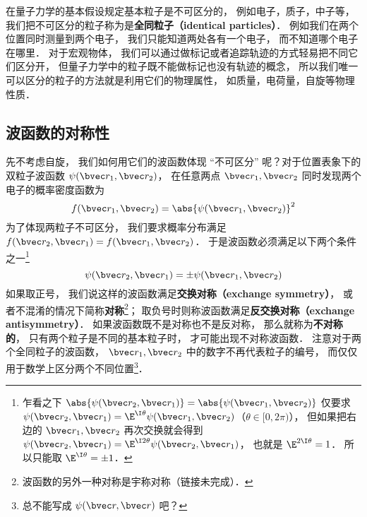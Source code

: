 

在量子力学的基本假设规定基本粒子是不可区分的， 例如电子，质子，中子等， 我们把不可区分的粒子称为是\textbf{全同粒子（identical particles）}． 例如我们在两个位置同时测量到两个电子， 我们只能知道两处各有一个电子， 而不知道哪个电子在哪里． 对于宏观物体， 我们可以通过做标记或者追踪轨迹的方式轻易把不同它们区分开， 但量子力学中的粒子既不能做标记也没有轨迹的概念， 所以我们唯一可以区分的粒子的方法就是利用它们的物理属性， 如质量，电荷量，自旋等物理性质．

\subsection{波函数的对称性}
先不考虑自旋， 我们如何用它们的波函数体现 “不可区分” 呢？对于位置表象下的双粒子波函数 $\psi(\bvec r_1, \bvec r_2)$， 在任意两点 $\bvec r_1, \bvec r_2$ 同时发现两个电子的概率密度函数为%
\begin{equation}
f(\bvec r_1, \bvec r_2) = \abs{\psi(\bvec r_1, \bvec r_2)}^2
\end{equation}
为了体现两粒子不可区分， 我们要求概率分布满足 $f(\bvec r_2, \bvec r_1) = f(\bvec r_1, \bvec r_2)$． 于是波函数必须满足以下两个条件之一\footnote{乍看之下 $\abs{\psi(\bvec r_2, \bvec r_1)} = \abs{\psi(\bvec r_1, \bvec r_2)}$ 仅要求 $\psi(\bvec r_2, \bvec r_1) = \E^{\I \theta} \psi(\bvec r_1, \bvec r_2)$（$\theta \in [0, 2\pi)$）， 但如果把右边的 $\bvec r_1, \bvec r_2$ 再次交换就会得到 $\psi(\bvec r_2, \bvec r_1) = \E^{\I 2\theta} \psi(\bvec r_2, \bvec r_1)$， 也就是 $\E^{2\I\theta} = 1$． 所以只能取 $\E^{\I\theta} = \pm 1$．}
\begin{equation}\label{IdPar_eq5}
\psi(\bvec r_2, \bvec r_1) = \pm \psi(\bvec r_1, \bvec r_2)
\end{equation}
如果取正号， 我们说这样的波函数满足\textbf{交换对称（exchange symmetry）}， 或者不混淆的情况下简称\textbf{对称}\footnote{波函数的另外一种对称是宇称对称（链接未完成）．}； 取负号时则称波函数满足\textbf{反交换对称（exchange antisymmetry）}． 如果波函数既不是对称也不是反对称， 那么就称为\textbf{不对称的}， 只有两个粒子是不同的基本粒子时， 才可能出现不对称波函数． 注意对于两个全同粒子的波函数， $\bvec r_1, \bvec r_2$ 中的数字不再代表粒子的编号， 而仅仅用于数学上区分两个不同位置\footnote{总不能写成 $\psi(\bvec r, \bvec r)$ 吧？}．

